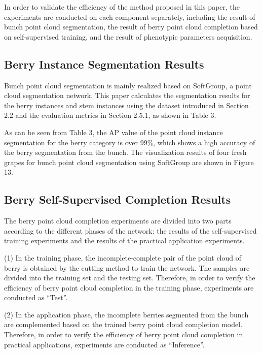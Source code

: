 \documentclass[12pt]{article}
\begin{document}
In order to validate the efficiency of the method proposed in this paper, the experiments are conducted on each component separately, including the result of bunch point cloud segmentation, the result of berry point cloud completion based on self-supervised training, and the result of phenotypic parameters acquisition.

\subsection{Berry Instance Segmentation Results}

Bunch point cloud segmentation is mainly realized based on SoftGroup, a point cloud segmentation network. 
This paper calculates the segmentation results for the berry instances and stem instances using the dataset introduced in 
Section 2.2 and the evaluation metrics in Section 2.5.1, as shown in Table 3.


As can be seen from Table 3, the AP value of the point cloud instance segmentation for the berry category is over 99\%, which shows a high accuracy of the berry segmentation from the bunch. The visualization results of four fresh grapes for bunch point cloud segmentation using SoftGroup are shown in Figure 13.


\subsection{Berry Self-Supervised Completion Results}

The berry point cloud completion experiments are divided into two parts according to the different phases of the network: the results of the self-supervised training experiments and the results of the practical application experiments.

(1) In the training phase, the incomplete-complete pair of the point cloud of berry is obtained by the cutting method to train the network. 
The samples are divided into the training set and the testing set. Therefore, in order to verify the efficiency of berry point cloud completion in the training phase, experiments are conducted as ``Test''.

(2) In the application phase, the incomplete berries segmented from the bunch are complemented based on the trained berry point cloud completion model. 
Therefore, in order to verify the efficiency of berry point cloud completion in practical applications, experiments are conducted as ``Inference''. 
\end{document}
